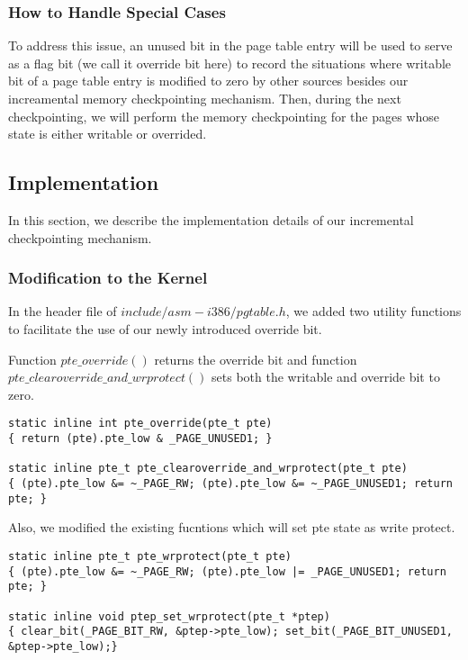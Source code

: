 \documentclass[11pt]{article}
\begin{document}
\subsubsection{How to Handle Special Cases}

To address this issue, an unused bit in the page table entry will be used to serve as a flag bit (we call it override bit here) to record the situations where writable bit of a page table entry is modified to zero by other sources besides our increamental memory checkpointing mechanism. Then, during the next checkpointing, we will perform the memory checkpointing for the pages whose state is either writable or overrided. 

\subsection{Implementation}

In this section, we describe the implementation details of our incremental checkpointing mechanism. 

\subsubsection{Modification to the Kernel}

In the header file of $include/asm-i386/pgtable.h$, we added two utility functions to facilitate the use of our newly introduced override bit. 

Function $pte\_override()$ returns the override bit and function $pte\_clearoverride\_and\_wrprotect()$ sets both the writable and override bit to zero.

\begin{lstlisting}[style=CStyle]
static inline int pte_override(pte_t pte)       
{ return (pte).pte_low & _PAGE_UNUSED1; }

static inline pte_t pte_clearoverride_and_wrprotect(pte_t pte)  
{ (pte).pte_low &= ~_PAGE_RW; (pte).pte_low &= ~_PAGE_UNUSED1; return pte; }
\end{lstlisting}

Also, we modified the existing fucntions which will set pte state as write protect.

\begin{lstlisting}[style=CStyle]
static inline pte_t pte_wrprotect(pte_t pte)   
{ (pte).pte_low &= ~_PAGE_RW; (pte).pte_low |= _PAGE_UNUSED1; return pte; }

static inline void ptep_set_wrprotect(pte_t *ptep)              
{ clear_bit(_PAGE_BIT_RW, &ptep->pte_low); set_bit(_PAGE_BIT_UNUSED1, &ptep->pte_low);}
\end{lstlisting}
\end{document}
